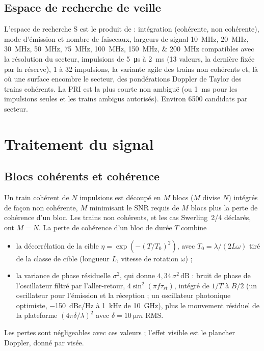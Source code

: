 \documentclass[11pt,a4paper]{article}
\newcommand{\dB}{\,\mathrm{dB}}
\begin{document}
\subsection{Espace de recherche de veille}
L'espace de recherche S est le produit de : intégration (cohérente, non cohérente), mode d'émission et nombre de
faisceaux, largeurs de signal \SIlist{10;20;30;50;75;100;150;200}{MHz} compatibles avec la résolution du secteur,
impulsions de \SI{5}{\micro s} à \SI{2}{ms} (13 valeurs, la dernière fixée par la réserve), 1 à 32 impulsions, la
variante agile des trains non cohérents et, là où une surface encombre le secteur, des pondérations Doppler de Taylor
des trains cohérents. La PRI est la plus courte non ambiguë (ou \SI{1}{ms} pour les impulsions seules et les trains
ambigus autorisés). Environ \num{6500} candidats par secteur.

\section{Traitement du signal}\label{sec:proc}

\subsection{Blocs cohérents et cohérence}
Un train cohérent de $N$ impulsions est découpé en $M$ blocs ($M$ divise $N$) intégrés de façon non cohérente, $M$
minimisant le SNR requis de $M$ blocs plus la perte de cohérence d'un bloc. Les trains non cohérents, et les cas
Swerling~2/4 déclarés, ont $M = N$. La perte de cohérence d'un bloc de durée $T$ combine
\begin{itemize}
  \item la décorrélation de la cible $\eta = \exp(-(T/T_0)^2)$, avec $T_0 = \lambda/(2L\omega)$ tiré de la classe de
        cible (longueur $L$, vitesse de rotation $\omega$) ;
  \item la variance de phase résiduelle $\sigma^2$, qui donne $4,34\,\sigma^2\dB$ : bruit de phase de l'oscillateur
        filtré par l'aller-retour, $4\sin^2(\pi f\tau_{rt})$, intégré de $1/T$ à $B/2$ (un oscillateur pour l'émission
        et la réception ; un oscillateur photonique optimiste, \SI{-150}{dBc/Hz} à \SI{1}{kHz} de \SI{10}{GHz}), plus le
        mouvement résiduel de la plateforme $(4\pi\delta/\lambda)^2$ avec $\delta = \SI{10}{\micro m}$ RMS.
\end{itemize}
Les pertes sont négligeables avec ces valeurs ; l'effet visible est le plancher Doppler, donné par visée.
\end{document}
